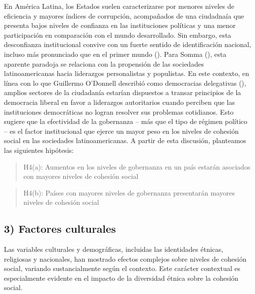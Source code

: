 \documentclass[
  spanish,
  letterpaper,
  DIV=11,
  numbers=noendperiod]{scrartcl}
\begin{document}
En América Latina, los Estados suelen caracterizarse por menores niveles
de eficiencia y mayores índices de corrupción, acompañados de una
ciudadnaía que presenta bajos niveles de confianza en las instituciones
políticas y una menor participación en comparación con el mundo
desarrollado. Sin embargo, esta desconfianza institucional convive con
un fuerte sentido de identificación nacional, incluso más pronunciado
que en el primer mundo (). Para Somma
(), esta aparente paradoja se
relaciona con la propensión de las sociedades latinoamericanas hacia
liderazgos personalistas y populistas. En este contexto, en línea con lo
que Guillermo O'Donnell describió como democracias delegativas
(), amplios sectores de
la ciudadanía estarían dispuestos a transar principios de la democracia
liberal en favor a liderazgos autoritarios cuando perciben que las
instituciones democráticas no logran resolver sus problemas cotidianos.
Esto sugiere que la efectividad de la gobernanza -- más que el tipo de
régimen político -- es el factor institucional que ejerce un mayor peso
en los niveles de cohesión social en las sociedades latinoamericanas. A
partir de esta discusión, planteamos las siguientes hipótesis:

\begin{quote}
H4(a): Aumentos en los niveles de gobernanza en un país estarán
asociados con mayores niveles de cohesión social
\end{quote}

\begin{quote}
H4(b): Países con mayores niveles de gobernanza presentarán mayores
niveles de cohesión social
\end{quote}

\subsection{3) Factores culturales}\label{factores-culturales}

Las variables culturales y demográficas, incluidas las identidades
étnicas, religiosas y nacionales, han mostrado efectos complejos sobre
niveles de cohesión social, variando sustancialmente según el contexto.
Este carácter contextual es especialmente evidente en el impacto de la
diversidad étnica sobre la cohesión social.
\end{document}
